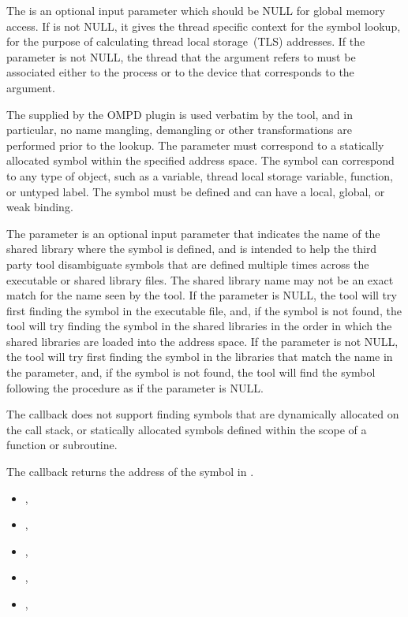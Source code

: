 The  is an optional input parameter which should be NULL for global memory 
access. If   is not NULL, it gives the thread specific context for the symbol 
lookup, for the purpose of calculating thread local storage~(TLS) addresses.
If the  parameter is not NULL, the thread that the  
argument refers to must be associated either to the process or to the device that corresponds to 
the  argument.

The  supplied by the OMPD plugin is used verbatim by the tool, and in particular, 
no name mangling, demangling or other transformations are performed prior to the lookup.
The  parameter must correspond to a statically allocated symbol within the 
specified address space. The symbol can correspond to any type of object, such as a variable, 
thread local storage variable, function, or untyped label. The symbol must be defined and can have 
a local, global, or weak binding.

The  parameter is an optional input parameter that indicates the 
name of the shared library where the symbol is defined, and is intended to help the third party tool 
disambiguate symbols that are defined multiple times across the executable or shared library files. 
The shared library name may not be an exact match for the name seen by the tool. If the 
 parameter is NULL, the tool will try first finding the symbol in the executable file, 
and, if the symbol is not found, the tool will try finding the symbol in the shared libraries in the order 
in which the shared libraries are loaded into the address space. If the  parameter is 
not NULL, the tool will try first finding the symbol in the libraries that match the name in the 
 parameter, and, if the symbol is not found, the tool will find the symbol following
the procedure as if the  parameter is NULL.

The callback does not support finding symbols that are dynamically allocated on the call 
stack, or statically allocated symbols defined within the scope of a function or subroutine.

The callback returns the address of the symbol in .

\crossreferences
\begin{itemize}
\item
  , 
\item
  , 
\item
  , 
\item
  , 
\item
  , 
\end{itemize}

